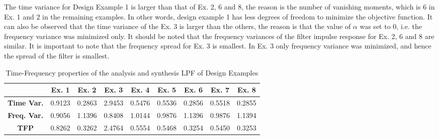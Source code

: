 The time variance for Design Example 1 is larger than that of Ex. 2, 6 and 8, the reason is the number of vanishing moments, which is $6$ in Ex. 1 and $2$ in the remaining examples. In other words, design example 1 has less degrees of freedom to minimize the objective function. It can also be observed that the time variance of the Ex. 3 is larger than the others, the reason is that the value of $\alpha$ was set to $0$, i.e. the frequency variance was minimized only. 
It should be noted that the frequency variances of the filter impulse response for Ex. 2, 6 and 8 are similar.  It is important to note that the frequency spread for Ex. 3 is smallest. In Ex. 3 only frequency variance was minimized, and hence the spread of the filter is smallest. 
 \begin{table}
 \resizebox{0.9\textwidth}{!}
 {    %
 \begin{minipage}{\textwidth}
 \onehalfspacing
 \centering
 \caption{Time-Frequency properties of the analysis and synthesis LPF of Design Examples}
 \label{TFP of ana. and synth. LPF}
 \begin{tabular}{c|c|c|c|c|c|c|c|c}
 \hline
  & \textbf{Ex. 1}   & \textbf{Ex. 2} & \textbf{Ex. 3} & \textbf{Ex. 4} & \textbf{Ex. 5}   & \textbf{Ex. 6} & \textbf{Ex. 7} & \textbf{Ex. 8}\\
 \hline
 \hline
 
        \textbf{ Time Var.} & 0.9123 & 0.2863 & 2.9453 & 0.5476 & 0.5536 & 0.2856 & 0.5518 & 0.2855 \\
        \textbf{Freq. Var.} & 0.9056 & 1.1396 & 0.8408 & 1.0144 & 0.9876 & 1.1396 & 0.9876 & 1.1394 \\
       \textbf{TFP}  & 0.8262 & 0.3262 & 2.4764 & 0.5554 & 0.5468 & 0.3254 & 0.5450 & 0.3253 \\
    
 \hline 
 \end{tabular}
 \end{minipage}
 }
 \end{table}
